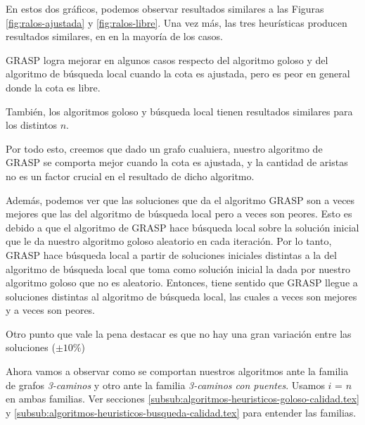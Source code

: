 En estos dos gráficos, podemos observar resultados similares a las Figuras \ref{fig:ralos-ajustada} y \ref{fig:ralos-libre}. Una vez más, las tres heurísticas producen resultados similares, en en la mayoría de los casos.

GRASP logra mejorar en algunos casos respecto del algoritmo goloso y del algoritmo de búsqueda local cuando la cota es ajustada, pero es peor en general donde la cota es libre.

También, los algoritmos goloso y búsqueda local tienen resultados similares para los distintos $n$.

Por todo esto, creemos que dado un grafo cualuiera, nuestro algoritmo de GRASP se comporta mejor cuando la cota es ajustada, y la cantidad de aristas no es un factor crucial en el resultado de dicho algoritmo.

Además, podemos ver que las soluciones que da el algoritmo GRASP son a veces mejores que las del algoritmo de búsqueda local pero a veces son peores. Esto es debido a que el algoritmo de GRASP hace búsqueda local sobre la solución inicial que le da nuestro algoritmo goloso aleatorio en cada iteración. Por lo tanto, GRASP hace búsqueda local a partir de soluciones iniciales distintas a la del algoritmo de búsqueda local que toma como solución inicial la dada por nuestro algoritmo goloso que no es aleatorio. Entonces, tiene sentido que GRASP llegue a soluciones distintas al algoritmo de búsqueda local, las cuales a veces son mejores y a veces son peores.

Otro punto que vale la pena destacar es que no hay una gran variación entre las soluciones ($ \pm 10\%$)



% 


Ahora vamos a observar como se comportan nuestros algoritmos ante la familia de grafos \emph{3-caminos} y otro ante la familia \emph{3-caminos con puentes}. Usamos $i$ = $n$ en ambas familias. Ver secciones \ref{subsub:algoritmos-heuristicos-goloso-calidad.tex} y \ref{subsub:algoritmos-heuristicos-busqueda-calidad.tex} para entender las familias.

